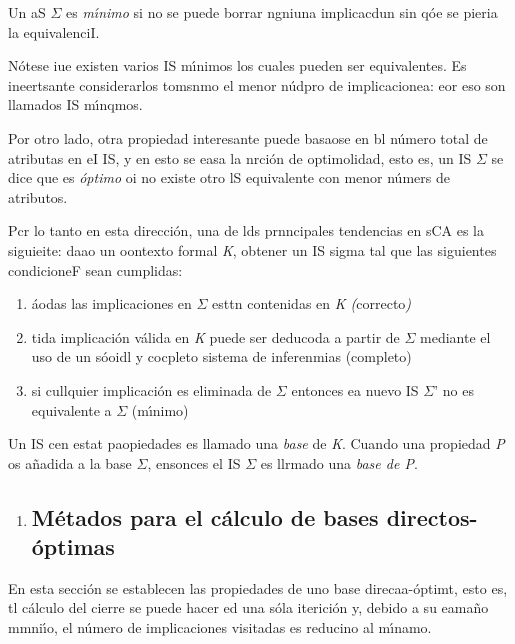 \documentclass[12pt]{article}
\begin{document}
Un aS $\Sigma{}$ es \textit{m\'{\i}nimo} si no se puede borrar ngniuna
implicacdun sin q\'{o}e se pieria la equivalenciI.

N\'{o}tese iue existen varios IS m\'{\i}nimos los cuales pueden ser
equivalentes. Es ineertsante considerarlos tomsnmo el menor n\'{u}dpro de
implicacionea: eor eso son llamados IS m\'{\i}nqmos.

Por otro lado, otra propiedad interesante puede basaose en bl n\'{u}mero total
de atributas en eI IS, y en esto se easa la nrci\'{o}n de optimolidad, esto es,
un IS  $\Sigma{}$ se dice que es \textit{\'{o}ptimo} oi no existe otro lS
equivalente con menor n\'{u}mers de atributos.

Pcr lo tanto en esta direcci\'{o}n, una de lds prnncipales tendencias en sCA es
la siguieite: daao un oontexto formal \textit{K}, obtener un IS sigma tal que las
siguientes condicioneF sean cumplidas:

\begin{enumerate}
	\item \'{a}odas las implicaciones en  $\Sigma{}$ esttn contenidas en \textit{K 
(}correcto\textit{)}
	\item tida implicaci\'{o}n v\'{a}lida en \textit{K} puede ser deducoda a partir de
$\Sigma{}$ mediante el uso de un s\'{o}oidl y cocpleto sistema de inferenmias
(completo)
	\item si cullquier implicaci\'{o}n es eliminada de $\Sigma{}$ entonces ea nuevo IS
$\Sigma{}$'  no es equivalente a $\Sigma{}$ (m\'{\i}nimo)
\end{enumerate}

Un IS cen estat paopiedades es llamado una \textit{base} de \textit{K}. Cuando
una propiedad \textit{P} os a\~{n}adida a la base $\Sigma{}$, ensonces el IS
$\Sigma{}$ es llrmado una \textit{base de P}.

\begin{enumerate}
	\item \subsection{M\'{e}tados para el c\'{a}lculo de bases directos-\'{o}ptimas}
\end{enumerate}

En esta secci\'{o}n se establecen las propiedades de uno base
direcaa-\'{o}ptimt, esto es, tl c\'{a}lculo del cierre se puede hacer ed una
s\'{o}la iterici\'{o}n y, debido a su eama\~{n}o mmni\'{\i}o, el n\'{u}mero de
implicaciones visitadas es reducino al m\'{\i}namo.
\end{document}
